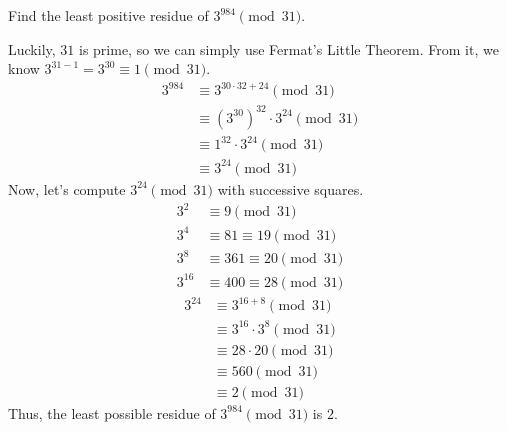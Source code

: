 \documentclass{article}
\begin{document}
\begin{problem}{}{}
    Find the least positive residue of $3^{984} \pmod{31}$.
\end{problem}
\begin{solution}{}{}
    Luckily, $31$ is prime, so we can simply use Fermat's Little Theorem. From it, we know $3^{31-1} = 3^{30} \equiv 1 \pmod{31}$.
    \begin{align*}
        3^{984} &\equiv 3^{30 \cdot 32 + 24} \pmod{31} \\
        &\equiv (3^{30})^{32} \cdot 3^{24} \pmod{31} \\
        &\equiv 1^{32} \cdot 3^{24} \pmod{31} \\
        &\equiv 3^{24} \pmod{31}
    \end{align*}
    Now, let's compute $3^{24} \pmod{31}$ with successive squares.
    \begin{align*}
        3^2 &\equiv 9 \pmod{31} \\
        3^4 &\equiv 81 \equiv 19 \pmod{31} \\
        3^8 &\equiv 361 \equiv 20 \pmod{31} \\
        3^{16} &\equiv 400 \equiv 28 \pmod{31}
    \end{align*}
    \begin{align*}
        3^{24} &\equiv 3^{16+8} \pmod{31} \\
        &\equiv 3^{16} \cdot 3^8 \pmod{31} \\
        &\equiv 28 \cdot 20 \pmod{31} \\
        &\equiv 560 \pmod{31} \\
        &\equiv 2 \pmod{31}
    \end{align*}
    Thus, the least possible residue of $3^{984} \pmod{31}$ is $2$.
\end{solution}
\end{document}
